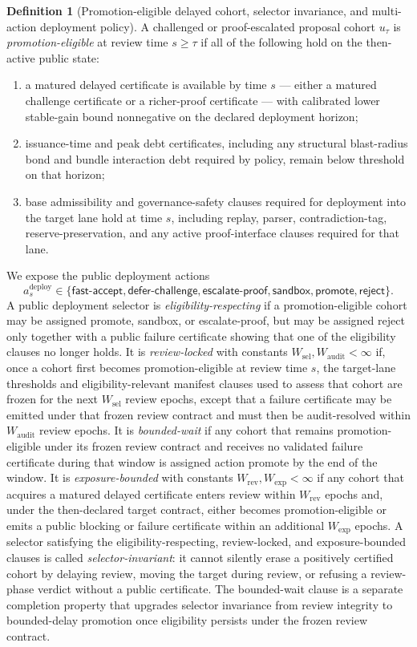 \documentclass[11pt]{article}
\theoremstyle{definition}
\newtheorem{definition}[theorem]{Definition}
\newcommand{\1}{\mathbf{1}}
\begin{document}
\begin{definition}[Promotion-eligible delayed cohort, selector invariance, and multi-action deployment policy]\label{def:promotion_eligible}
A challenged or proof-escalated proposal cohort $u_\tau$ is \emph{promotion-eligible} at review time $s\ge \tau$ if all of the following hold on the then-active public state:
\begin{enumerate}[label=(\roman*), leftmargin=2em]
  \item a matured delayed certificate is available by time $s$ --- either a matured challenge certificate or a richer-proof certificate --- with calibrated lower stable-gain bound nonnegative on the declared deployment horizon;
  \item issuance-time and peak debt certificates, including any structural blast-radius bond and bundle interaction debt required by policy, remain below threshold on that horizon;
  \item base admissibility and governance-safety clauses required for deployment into the target lane hold at time $s$, including replay, parser, contradiction-tag, reserve-preservation, and any active proof-interface clauses required for that lane.
\end{enumerate}
We expose the public deployment actions
\[
a_s^{\mathrm{deploy}}\in\{\textsf{fast-accept},\textsf{defer-challenge},\textsf{escalate-proof},\textsf{sandbox},\textsf{promote},\textsf{reject}\}.
\]
A public deployment selector is \emph{eligibility-respecting} if a promotion-eligible cohort may be assigned \textsf{promote}, \textsf{sandbox}, or \textsf{escalate-proof}, but may be assigned \textsf{reject} only together with a public failure certificate showing that one of the eligibility clauses no longer holds. It is \emph{review-locked} with constants $W_{\mathrm{sel}},W_{\mathrm{audit}}<\infty$ if, once a cohort first becomes promotion-eligible at review time $s$, the target-lane thresholds and eligibility-relevant manifest clauses used to assess that cohort are frozen for the next $W_{\mathrm{sel}}$ review epochs, except that a failure certificate may be emitted under that frozen review contract and must then be audit-resolved within $W_{\mathrm{audit}}$ review epochs. It is \emph{bounded-wait} if any cohort that remains promotion-eligible under its frozen review contract and receives no validated failure certificate during that window is assigned action \textsf{promote} by the end of the window. It is \emph{exposure-bounded} with constants $W_{\mathrm{rev}},W_{\mathrm{exp}}<\infty$ if any cohort that acquires a matured delayed certificate enters review within $W_{\mathrm{rev}}$ epochs and, under the then-declared target contract, either becomes promotion-eligible or emits a public blocking or failure certificate within an additional $W_{\mathrm{exp}}$ epochs. A selector satisfying the eligibility-respecting, review-locked, and exposure-bounded clauses is called \emph{selector-invariant}: it cannot silently erase a positively certified cohort by delaying review, moving the target during review, or refusing a review-phase verdict without a public certificate. The bounded-wait clause is a separate completion property that upgrades selector invariance from review integrity to bounded-delay promotion once eligibility persists under the frozen review contract.

\end{definition}
\end{document}
